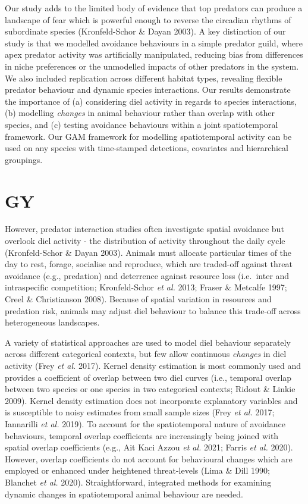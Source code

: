 \documentclass[11pt,a4paper,titlepage,twoside,openright]{style/unimelbthesis}
\begin{document}
\begin{mainmatter}
Our study adds to the limited body of evidence that top predators can produce a landscape of fear which is powerful enough to reverse the circadian rhythms of subordinate species (Kronfeld-Schor \& Dayan 2003). A key distinction of our study is that we modelled avoidance behaviours in a simple predator guild, where apex predator activity was artificially manipulated, reducing bias from differences in niche preferences or the unmodelled impacts of other predators in the system. We also included replication across different habitat types, revealing flexible predator behaviour and dynamic species interactions. Our results demonstrate the importance of (a) considering diel activity in regards to species interactions, (b) modelling \emph{changes} in animal behaviour rather than overlap with other species, and (c) testing avoidance behaviours within a joint spatiotemporal framework. Our GAM framework for modelling spatiotemporal activity can be used on any species with time-stamped detections, covariates and hierarchical groupings.

\hypertarget{gy-1}{%
\section{GY}\label{gy-1}}

However, predator interaction studies often investigate spatial avoidance but overlook diel activity - the distribution of activity throughout the daily cycle (Kronfeld-Schor \& Dayan 2003). Animals must allocate particular times of the day to rest, forage, socialise and reproduce, which are traded-off against threat avoidance (e.g., predation) and deterrence against resource loss (i.e.~inter and intraspecific competition; Kronfeld-Schor \emph{et al.} 2013; Fraser \& Metcalfe 1997; Creel \& Christianson 2008). Because of spatial variation in resources and predation risk, animals may adjust diel behaviour to balance this trade-off across heterogeneous landscapes.

A variety of statistical approaches are used to model diel behaviour separately across different categorical contexts, but few allow continuous \emph{changes} in diel activity (Frey \emph{et al.} 2017). Kernel density estimation is most commonly used and provides a coefficient of overlap between two diel curves (i.e., temporal overlap between two species or one species in two categorical contexts; Ridout \& Linkie 2009). Kernel density estimation does not incorporate explanatory variables and is susceptible to noisy estimates from small sample sizes (Frey \emph{et al.} 2017; Iannarilli \emph{et al.} 2019). To account for the spatiotemporal nature of avoidance behaviours, temporal overlap coefficients are increasingly being joined with spatial overlap coefficients (e.g., Ait Kaci Azzou \emph{et al.} 2021; Farris \emph{et al.} 2020). However, overlap coefficients do not account for behavioural changes which are employed or enhanced under heightened threat-levels (Lima \& Dill 1990; Blanchet \emph{et al.} 2020). Straightforward, integrated methods for examining dynamic changes in spatiotemporal animal behaviour are needed.


\end{mainmatter}
\end{document}
